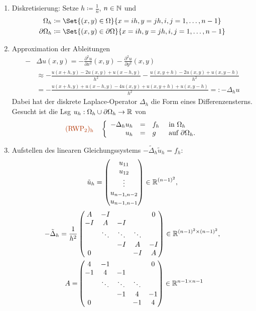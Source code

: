 \documentclass{cheat-sheet}
\newcommand{\bOmega}{\partial \Omega} %
\newcommand{\Laplace}{\Delta}
\newcommand{\tss}[1]{\textsubscript{#1}} %
\newcommand{\probl}[1]{\textcolor{ProblemColor}{#1}}
\begin{document}
\begin{enumerate}
  \item Diskretisierung: Setze $h \coloneqq \tfrac{1}{n}$, $n \in \mathbb{N}$ und
  \begin{align*}
    \Omega_h & \coloneqq \Set{(x, y) \in \Omega}{x = ih, y = jh, i,j = 1, \ldots, {n-1}} \\
    \bOmega_h & \coloneqq \Set{(x, y) \in \bOmega}{x = ih, y = jh, i,j = 1, \ldots, {n-1}}
  \end{align*}
  \item Approximation der Ableitungen
  \begin{align*}
  - & \Laplace u (x, y)
  = - \tfrac{\partial^2 u}{\partial x^2} (x,y) - \tfrac{\partial^2 u}{\partial y^2} (x, y) \\
  &\approx - \tfrac{u(x + h, y) - 2 u(x, y) + u(x-h, y)}{h^2} - \tfrac{u(x, y+h) - 2 u(x,y) + u(x, y-h)}{h^2} \\
  &= - \tfrac{u(x+h,y) + u(x-h,y) - 4 u(x, y) + u(x, y+h) + u(x, y-h)}{h^2} =: - \Laplace_h u
  \end{align*}
  Dabei hat der diskrete Laplace-Operator $\Laplace_h$ die Form eines Differenzensterns.
  Gesucht ist die Lsg $u_h : \Omega_h \cup \bOmega_h \to \R$ von
  \[
    \text{\probl{(RWP\tss{2})\tss{h}}} \quad
    \left\{ \begin{array}{rlll}
      - \Laplace_h u_h &=& f_h &\text{ in $\Omega_h$} \\
      u_h &=& g &\text{ auf $\bOmega_h$.}
    \end{array} \right.
  \]
  \item Aufstellen des linearen Gleichungssystems $- \tilde{\Laplace}_h \tilde{u}_h = f_h$:
  \[
    \tilde{u}_h = \begin{pmatrix}
      u_{11} \\
      u_{12} \\
      \vdots \\
      u_{n-1,n-2} \\
      u_{n-1,n-1}
    \end{pmatrix} \in \mathbb{R}^{(n-1)^2},
  \]
  \begin{align*}
    - \tilde{\Laplace}_h = \frac{1}{h^2} & \begin{pmatrix}
      A & -I & && 0 \\
      -I & A & -I && \\
      & \ddots & \ddots & \ddots \\
      && -I & A & -I \\
      0 &&& -I & A
    \end{pmatrix} \in \R^{(n-1)^2 \times (n-1)^2}, \\
    A = & \begin{pmatrix}
      4 & -1 & && 0 \\
      -1 & 4 & -1 && \\
      & \ddots & \ddots & \ddots \\
      && -1 & 4 & -1 \\
      0 &&& -1 & 4
    \end{pmatrix} \in \R^{n-1 \times n-1}
  \end{align*}
\end{enumerate}
\end{document}
